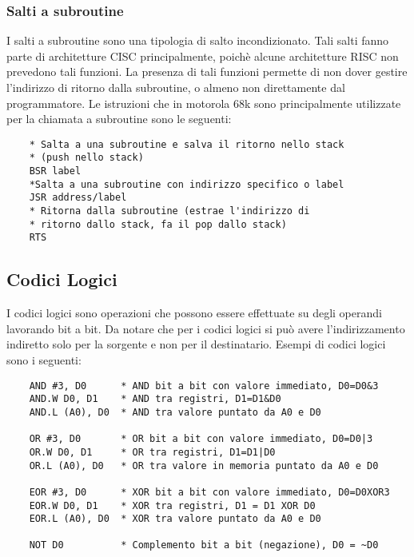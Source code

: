 \newpage

\subsubsection{Salti a subroutine}
I salti a subroutine sono una tipologia di salto incondizionato. Tali salti fanno parte di architetture CISC principalmente, poichè alcune architetture RISC non prevedono tali funzioni. La presenza di tali funzioni permette di non dover gestire l'indirizzo di ritorno dalla subroutine, o almeno non direttamente dal programmatore. Le istruzioni che in motorola 68k sono principalmente utilizzate per la chiamata a subroutine sono le seguenti:
\begin{lstlisting}
    * Salta a una subroutine e salva il ritorno nello stack 
    * (push nello stack)
    BSR label
    *Salta a una subroutine con indirizzo specifico o label
    JSR address/label
    * Ritorna dalla subroutine (estrae l'indirizzo di 
    * ritorno dallo stack, fa il pop dallo stack)
    RTS
\end{lstlisting}

\subsection{Codici Logici}
I codici logici sono operazioni che possono essere effettuate su degli operandi lavorando bit a bit. Da notare che per i codici logici si può avere l'indirizzamento indiretto solo per la sorgente e non per il destinatario. Esempi di codici logici sono i seguenti:
\begin{lstlisting}
    AND #3, D0      * AND bit a bit con valore immediato, D0=D0&3
    AND.W D0, D1    * AND tra registri, D1=D1&D0
    AND.L (A0), D0  * AND tra valore puntato da A0 e D0

    OR #3, D0       * OR bit a bit con valore immediato, D0=D0|3
    OR.W D0, D1     * OR tra registri, D1=D1|D0
    OR.L (A0), D0   * OR tra valore in memoria puntato da A0 e D0

    EOR #3, D0      * XOR bit a bit con valore immediato, D0=D0XOR3
    EOR.W D0, D1    * XOR tra registri, D1 = D1 XOR D0
    EOR.L (A0), D0  * XOR tra valore puntato da A0 e D0

    NOT D0          * Complemento bit a bit (negazione), D0 = ~D0
\end{lstlisting}

\newpage

